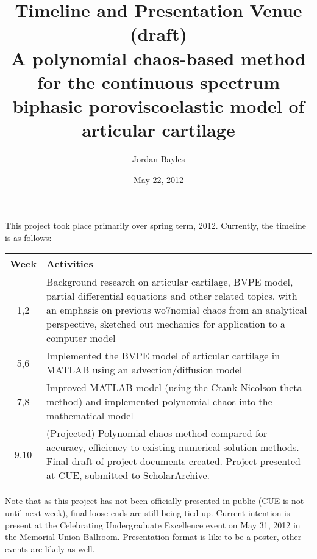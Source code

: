 \documentclass[11pt,letterpaper]{article}
\author{\normalsize Jordan Bayles}
\date{\normalsize May 22, 2012}
\title{\large Timeline and Presentation Venue (draft)\\
\normalsize A polynomial chaos-based method for the continuous spectrum biphasic poroviscoelastic model of articular cartilage}
\begin{document}
\maketitle

This project took place primarily over spring term, 2012. Currently, the timeline is as follows:
\begin{table}[H]
\begin{tabularx}{\linewidth}{c X}\toprule
Week	&	Activities \\\midrule
1,2		&	Background research on articular cartilage,
			BVPE model, partial differential equations
			and other related topics, with an emphasis
			on previous wo7nomial chaos from an analytical perspective,
			sketched out mechanics for application to a computer
			model\\
5,6		&	Implemented the BVPE model of articular cartilage
			in MATLAB using an advection/diffusion model\\
7,8		&	Improved MATLAB model (using the Crank-Nicolson theta method) and
			implemented polynomial chaos into the mathematical model \\
9,10	&	(Projected) Polynomial chaos method compared for accuracy,
			efficiency to existing numerical solution methods. Final draft
			of project documents created. Project presented at CUE, submitted
			to ScholarArchive. \\\bottomrule
\end{tabularx}
\end{table}

Note that as this project has not been officially presented in public (CUE is not until next week), final loose ends are still being tied up. Current intention is present
at the Celebrating Undergraduate Excellence event on May 31, 2012 in the Memorial
Union Ballroom. Presentation format is like to be a poster, other events are likely as
well. 
\end{document}
